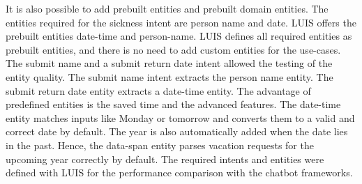 It is also possible to add prebuilt entities and prebuilt domain entities.
The entities required for the sickness intent are person name and date. 
LUIS offers the prebuilt entities date-time and person-name.
LUIS defines all required entities as prebuilt entities, and there is no need to add custom entities for the use-cases.
The submit name and a submit return date intent allowed the testing of the entity quality.
The submit name intent extracts the person name entity.
The submit return date entity extracts a date-time entity.
The advantage of predefined entities is the saved time and the 
advanced features.
The date-time entity matches inputs like Monday or tomorrow and converts them to a valid and correct date by default.
The year is also automatically added when the date lies in the past.
Hence, the data-span entity parses vacation requests for the upcoming year correctly by default.
The required intents and entities were defined with LUIS for the performance comparison with the chatbot frameworks.
